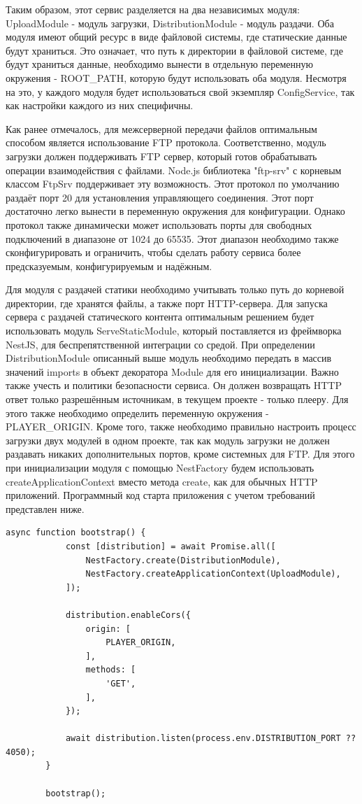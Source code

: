 	Таким образом, этот сервис разделяется на два независимых модуля: UploadModule - модуль загрузки, DistributionModule - модуль раздачи. Оба модуля имеют общий ресурс в виде файловой системы, где статические данные будут храниться. Это означает, что путь к директории в файловой системе, где будут храниться данные, необходимо вынести в отдельную переменную окружения - ROOT\_PATH, которую будут использовать оба модуля. Несмотря на это, у каждого модуля будет использоваться свой экземпляр ConfigService, так как настройки каждого из них специфичны.

	Как ранее отмечалось, для межсерверной передачи файлов оптимальным способом является использование FTP протокола. Соответственно, модуль загрузки должен поддерживать FTP сервер, который готов обрабатывать операции взаимодействия с файлами. Node.js библиотека "ftp-srv" с корневым классом FtpSrv поддерживает эту возможность. Этот протокол по умолчанию раздаёт порт 20 для установления управляющего соединения. Этот порт достаточно легко вынести в переменную окружения для конфигурации. Однако протокол также динамически может использовать порты для свободных подключений в диапазоне от 1024 до 65535. Этот диапазон необходимо также сконфигурировать и ограничить, чтобы сделать работу сервиса более предсказуемым, конфигурируемым и надёжным.

	Для модуля с раздачей статики необходимо учитывать только путь до корневой директории, где хранятся файлы, а также порт HTTP-сервера. Для запуска сервера с раздачей статического контента оптимальным решением будет использовать модуль ServeStaticModule, который поставляется из фреймворка NestJS, для беспрепятственной интеграции со средой. При определении DistributionModule описанный выше модуль необходимо передать в массив значений imports в объект декоратора Module для его инициализации. Важно также учесть и политики безопасности сервиса. Он должен возвращать HTTP ответ только разрешённым источникам, в текущем проекте - только плееру. Для этого также необходимо определить переменную окружения - PLAYER\_ORIGIN.
	Кроме того, также необходимо правильно настроить процесс загрузки двух модулей в одном проекте, так как модуль загрузки не должен раздавать никаких дополнительных портов, кроме системных для FTP. Для этого при инициализации модуля с помощью NestFactory будем использовать createApplicationContext вместо метода create, как для обычных HTTP приложений. Программный код старта приложения с учетом требований представлен ниже.

	\begin{lstlisting}[caption=Код старта сервиса-хранилища]
		async function bootstrap() {
			const [distribution] = await Promise.all([
				NestFactory.create(DistributionModule),
				NestFactory.createApplicationContext(UploadModule),
			]);
			
			distribution.enableCors({
				origin: [
					PLAYER_ORIGIN,
				],
				methods: [
					'GET',
				],
			});
			
			await distribution.listen(process.env.DISTRIBUTION_PORT ?? 4050);
		}
		
		bootstrap();
	\end{lstlisting}

